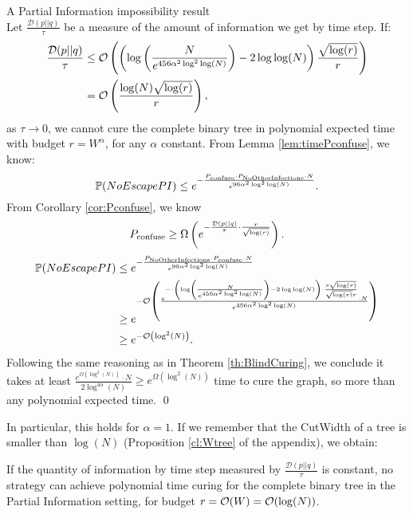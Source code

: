 \begin{theorem}{A Partial Information impossibility result} \label{th:partialInfo} \\
Let $\frac{\mathcal{D}(p||q)}{\tau}$ be a measure of the amount of information we get by time step. If:
\begin{align*}
\frac{\mathcal{D}(p||q)}{\tau} &\leq \mathcal{O}\left( \left(\log\left(\frac{N}{e^{456\alpha^2\log^2\log(N)}} \right)  - 2\log\log(N)\right)\frac{\sqrt{\log(r)} }{r} \right)  \\ 
&= \mathcal{O}\left(\frac{\log(N)\sqrt{\log(r)} }{r}\right),
\end{align*}  as $\tau \to 0$, we cannot cure the complete binary tree in polynomial expected time with budget $r = W^\alpha$, for any $\alpha$ constant.
\proof 
From Lemma \ref{lem:timePconfuse}, we know: 
$$ \mathbb{P}(NoEscapePI) \leq e^{-\frac{P_{\rm confuse} \cdot P_{\rm NoOtherInfections} \cdot N}{e^{96\alpha^2\log^2\log(N)}}}.$$
From Corollary \ref{cor:Pconfuse}, we know 
$$P_{\rm confuse} \geq \Omega\left(e^{-\frac{\mathcal{D}(p||q)}{\tau} \cdot \frac{r}{\sqrt{\log(r)} } } \right).$$
\begin{align*}
 \mathbb{P}(NoEscapePI) &\leq e^{-\frac{ P_{\rm NoOtherInfections} \cdot P_{\rm confuse} \cdot N}{e^{96\alpha^2\log^2\log(N)}}} \\
 &\geq  e^{-\mathcal{O}\left(\frac{ e^{- \cdot\left(\log\left(\frac{N}{e^{456\alpha^2\log^2\log(N)}} \right)  - 2\log\log(N)\right)  \cdot \frac{r\sqrt{\log(r)}}{\sqrt{\log(r)} r}} \cdot N}{e^{456\alpha^2\log^2\log(N)}}\right)} \\
 &\geq e^{-\mathcal{O}\left(\log^2(N)\right)}.
\end{align*}
Following the same reasoning as in Theorem \ref{th:BlindCuring}, we conclude it takes at least $ \frac{e^{\Omega \left(  \log^2(N)\right)} \cdot N}{2\log^{4\alpha}(N)}  \geq e^{\Omega\left(  \log^2(N)\right)} $ time to cure the graph, so more than any polynomial expected time.
\qed 
\end{theorem}
In particular, this holds for $\alpha = 1$. If we remember that the {\sc CutWidth} of a tree is smaller than $\log(N)$ (Proposition \ref{cl:Wtree} of the appendix), we obtain:

\begin{corollary}
If the quantity of information by time step measured by $\frac{\mathcal{D}(p||q)}{\tau} $ is constant, no strategy can achieve polynomial time curing for the complete binary tree in the Partial Information setting, for budget $r= \mathcal{O}(W) = \mathcal{O}(\log(N))$.
\end{corollary}
